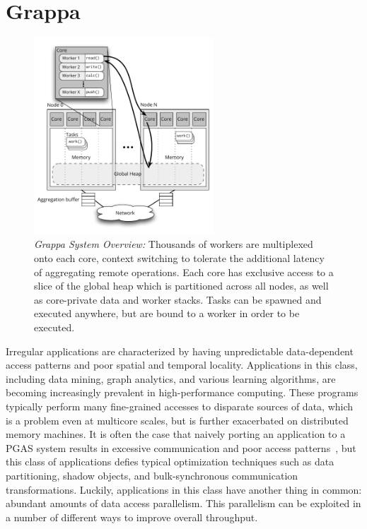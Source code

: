 \section{Grappa}

\begin{figure}[t]
  \centering
  \includegraphics[width=0.6\textwidth]{figs/grappa_system.pdf}
  \caption{\emph{Grappa System Overview:}
    Thousands of workers are multiplexed onto each core, context switching to tolerate the additional latency of aggregating remote operations. Each core has exclusive access to a slice of the global heap which is partitioned across all nodes, as well as core-private data and worker stacks. Tasks can be spawned and executed anywhere, but are bound to a worker in order to be executed.
  }
  \label{fig:system}
\end{figure}

Irregular applications are characterized by having unpredictable data-dependent access patterns and poor spatial and temporal locality. Applications in this class, including data mining, graph analytics, and various learning algorithms, are becoming increasingly prevalent in high-performance computing. These programs typically perform many fine-grained accesses to disparate sources of data, which is a problem even at multicore scales, but is further exacerbated on distributed memory machines.
It is often the case that naively porting an application to a PGAS system results in excessive communication and poor access patterns~\cite{pgas-analysis}, but this class of applications defies typical optimization techniques such as data partitioning, shadow objects, and bulk-synchronous communication transformations.
Luckily, applications in this class have another thing in common: abundant amounts of data access parallelism. This parallelism can be exploited in a number of different ways to improve overall throughput.

